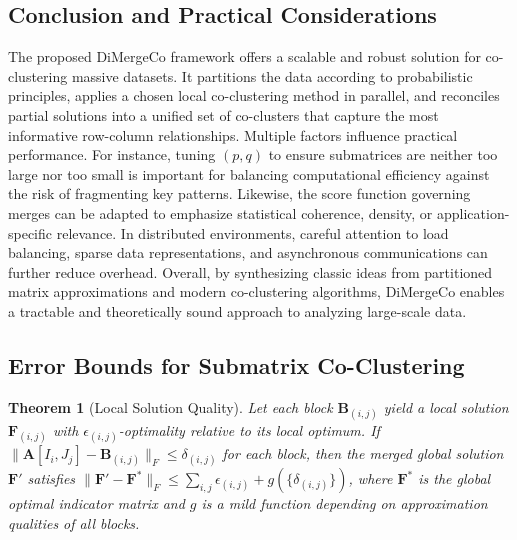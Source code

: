 \documentclass[journal]{IEEEtran}
\newtheorem{theorem}{Theorem}
\begin{document}
\subsection{Conclusion and Practical Considerations}

The proposed DiMergeCo framework offers a scalable and robust solution for co-clustering massive datasets. It partitions the data according to probabilistic principles, applies a chosen local co-clustering method in parallel, and reconciles partial solutions into a unified set of co-clusters that capture the most informative row-column relationships. Multiple factors influence practical performance. For instance, tuning $(p, q)$ to ensure submatrices are neither too large nor too small is important for balancing computational efficiency against the risk of fragmenting key patterns. Likewise, the score function governing merges can be adapted to emphasize statistical coherence, density, or application-specific relevance. In distributed environments, careful attention to load balancing, sparse data representations, and asynchronous communications can further reduce overhead. Overall, by synthesizing classic ideas from partitioned matrix approximations and modern co-clustering algorithms, DiMergeCo enables a tractable and theoretically sound approach to analyzing large-scale data.



\subsection{Error Bounds for Submatrix Co-Clustering}
\begin{theorem}[Local Solution Quality]
    \label{thm:local-solution-quality}
    Let each block $\mathbf{B}_{(i,j)}$ yield a local solution $\mathbf{F}_{(i,j)}$ with $\epsilon_{(i,j)}$-optimality relative to its local optimum. If $\|\mathbf{A}[I_i,J_j] - \mathbf{B}_{(i,j)}\|_F \le \delta_{(i,j)}$ for each block, then the merged global solution $\mathbf{F}'$ satisfies $\|\mathbf{F}' - \mathbf{F}^*\|_F \le \sum_{i,j} \epsilon_{(i,j)} + g(\{\delta_{(i,j)}\})$, where $\mathbf{F}^*$ is the global optimal indicator matrix and $g$ is a mild function depending on approximation qualities of all blocks.
\end{theorem}
\end{document}
